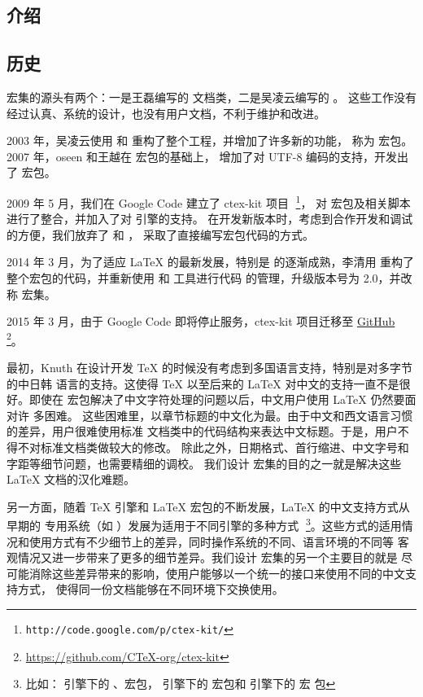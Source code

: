 \documentclass{ctxdoc}
\begin{document}
\begin{documentation}

\section{介绍}

\subsection*{历史}

\CTeX{} 宏集的源头有两个：一是王磊编写的  文档类，二是吴凌云编写的
。
这些工作没有经过认真、系统的设计，也没有用户文档，不利于维护和改进。

2003 年，吴凌云使用  和  重构了整个工程，并增加了许多新的功能，
称为  宏包。2007 年，oseen 和王越在  宏包的基础上，
增加了对 UTF-8 编码的支持，开发出了  宏包。

2009 年 5 月，我们在 Google Code 建立了 ctex-kit 项目^^A
\footnote{\nolinkurl{http://code.google.com/p/ctex-kit/}}，
对  宏包及相关脚本进行了整合，并加入了对 \XeTeX{} 引擎的支持。
在开发新版本时，考虑到合作开发和调试的方便，我们放弃了  和 ，
采取了直接编写宏包代码的方式。

2014 年 3 月，为了适应 \LaTeX{} 的最新发展，特别是 \LaTeXiii{} 的逐渐成熟，李清用
\LaTeXiii{} 重构了整个宏包的代码，并重新使用  和  工具进行代码
的管理，升级版本号为 2.0，并改称 \CTeX{} 宏集。

2015 年 3 月，由于 Google Code 即将停止服务，ctex-kit 项目迁移至
\href{https://github.com/CTeX-org/ctex-kit}{GitHub}^^A
\footnote{\url{https://github.com/CTeX-org/ctex-kit}}。

最初，Knuth 在设计开发 \TeX{} 的时候没有考虑到多国语言支持，特别是对多字节的中日韩
语言的支持。这使得 \TeX{} 以至后来的 \LaTeX{} 对中文的支持一直不是很好。即使在
 宏包解决了中文字符处理的问题以后，中文用户使用 \LaTeX{} 仍然要面对许
多困难。
这些困难里，以章节标题的中文化为最。由于中文和西文语言习惯的差异，用户很难使用标准
文档类中的代码结构来表达中文标题。于是，用户不得不对标准文档类做较大的修改。
除此之外，日期格式、首行缩进、中文字号和字距等细节问题，也需要精细的调校。
我们设计 \CTeX{} 宏集的目的之一就是解决这些 \LaTeX{} 文档的汉化难题。

另一方面，随着 \TeX{} 引擎和 \LaTeX{} 宏包的不断发展，\LaTeX{} 的中文支持方式从早期的
专用系统（如 ）发展为适用于不同引擎的多种方式^^A
\footnote{比如：\pdfTeX{} 引擎下的 、宏包，
\XeTeX{} 引擎下的  宏包和 \LuaTeX{} 引擎下的  宏
包}。这些方式的适用情况和使用方式有不少细节上的差异，同时操作系统的不同、语言环境的不同等
客观情况又进一步带来了更多的细节差异。我们设计 \CTeX{} 宏集的另一个主要目的就是
尽可能消除这些差异带来的影响，使用户能够以一个统一的接口来使用不同的中文支持方式，
使得同一份文档能够在不同环境下交换使用。


\end{documentation}
\end{document}

